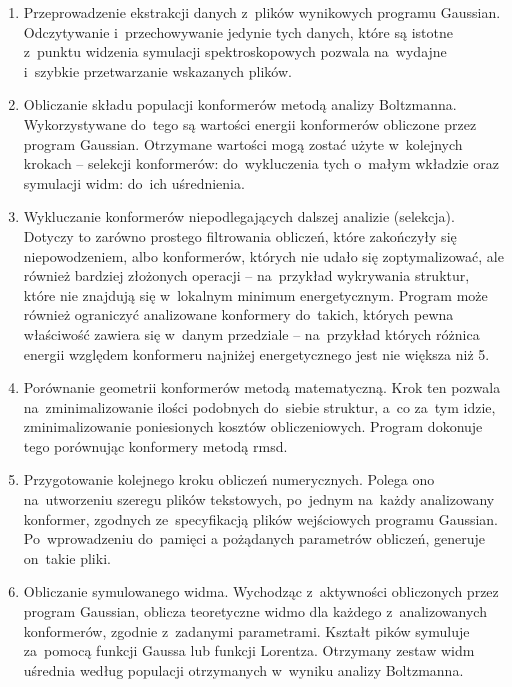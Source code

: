 \begin{enumerate}
  \item Przeprowadzenie ekstrakcji danych z~plików wynikowych programu Gaussian.
    Odczytywanie i~przechowywanie jedynie tych danych, które są istotne z~punktu widzenia
      symulacji spektroskopowych pozwala na~wydajne i~szybkie przetwarzanie wskazanych plików.

  \item Obliczanie składu populacji konformerów metodą analizy Boltzmanna.
    Wykorzystywane do~tego są wartości energii konformerów obliczone przez program Gaussian.
    Otrzymane wartości mogą zostać użyte w~kolejnych krokach \--- selekcji konformerów:
      do~wykluczenia tych o~małym wkładzie oraz symulacji widm: do~ich uśrednienia.

  \item Wykluczanie konformerów niepodlegających dalszej analizie (selekcja).
    Dotyczy to zarówno prostego filtrowania obliczeń, które zakończyły się niepowodzeniem,
      albo konformerów, których nie udało się zoptymalizować, ale również bardziej złożonych
      operacji \--- na~przykład wykrywania struktur, które nie znajdują się w~lokalnym
      minimum energetycznym.
    Program \tesliper{} może również ograniczyć analizowane konformery do~takich, których
      pewna właściwość zawiera się w~danym przedziale \--- na~przykład których różnica
      energii względem konformeru najniżej energetycznego jest nie większa niż \SI{5}{\kcalpm}.

  \item Porównanie geometrii konformerów metodą matematyczną.
    Krok ten pozwala na~zminimalizowanie ilości podobnych do~siebie struktur, a~co za~tym idzie,
      zminimalizowanie poniesionych kosztów obliczeniowych.
    Program dokonuje tego porównując konformery metodą \gls{rmsd}.

  \item Przygotowanie kolejnego kroku obliczeń numerycznych.
    Polega ono na~utworzeniu szeregu plików tekstowych, po~jednym na~każdy analizowany konformer,
      zgodnych ze~specyfikacją plików wejściowych programu Gaussian.
    Po~wprowadzeniu do~pamięci \tesliper{}a pożądanych parametrów obliczeń,
      generuje on~takie pliki.

  \item Obliczanie symulowanego widma.
    Wychodząc z~aktywności obliczonych przez program Gaussian, \tesliper{} oblicza teoretyczne
      widmo dla każdego z~analizowanych konformerów, zgodnie z~zadanymi parametrami.
    Kształt pików symuluje za~pomocą funkcji Gaussa lub funkcji Lorentza.
    Otrzymany zestaw widm uśrednia według populacji otrzymanych w~wyniku analizy Boltzmanna.


\end{enumerate}
